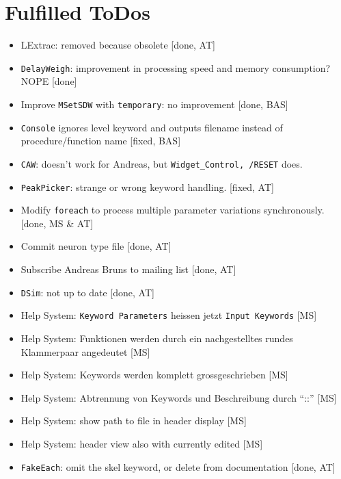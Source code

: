 \documentclass[12pt]{article}
\begin{document}
\section{Fulfilled ToDos}
\begin{itemize}
\item LExtrac: removed because obsolete [done, AT]
\item \texttt{DelayWeigh}: improvement in processing speed and memory consumption? NOPE [done]
\item Improve \texttt{MSetSDW} with \texttt{temporary}: no improvement [done, BAS]
\item \texttt{Console} ignores level keyword and outputs filename instead of procedure/function name [fixed, BAS]
\item \texttt{CAW}: doesn't work for Andreas, but \texttt{Widget_Control, /RESET} does.
\item \texttt{PeakPicker}: strange or wrong keyword handling. [fixed, AT]
\item Modify \texttt{foreach} to process multiple parameter variations synchronously. [done, MS & AT] 
\item Commit neuron type file [done, AT]
\item Subscribe Andreas Bruns to mailing list [done, AT] 
\item \texttt{DSim}: not up to date [done, AT]
\item Help System: \texttt{Keyword Parameters} heissen jetzt \texttt{Input Keywords} [MS]
\item Help System: Funktionen werden durch ein nachgestelltes rundes Klammerpaar angedeutet [MS]
\item Help System: Keywords werden komplett grossgeschrieben [MS]
\item Help System: Abtrennung von Keywords und Beschreibung durch ``::'' [MS]
\item Help System: show path to file in header display [MS]
\item Help System: header view also with currently edited [MS]
\item \texttt{FakeEach}: omit the skel keyword, or delete from documentation [done, AT]
\end{itemize}
\end{document}
